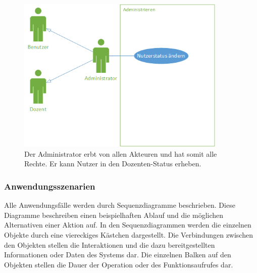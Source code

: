 \documentclass[12pt,a4paper]{article}
\begin{document}
\begin{figure}[H]
	\centering
	\includegraphics[width=10cm]{Bilder/Anwendungsfalldiagramme/Admin.png}
	\caption{Der Administrator erbt von allen Akteuren und hat somit alle Rechte. Er kann Nutzer in den Dozenten-Status erheben.}
	\label{AwfAdmin}
\end{figure}

\newpage

\subsubsection*{Anwendungsszenarien}
Alle Anwendungsfälle werden durch Sequenzdiagramme beschrieben. Diese Diagramme beschreiben einen beispielhaften Ablauf und die möglichen Alternativen einer Aktion auf. In den Sequenzdiagrammen werden die einzelnen Objekte durch eine viereckiges Kästchen dargestellt. Die Verbindungen zwischen den Objekten stellen die Interaktionen und die dazu bereitgestellten Informationen oder Daten des Systems dar. Die einzelnen Balken auf den Objekten stellen die Dauer der Operation oder des Funktionsaufrufes dar.
\end{document}
